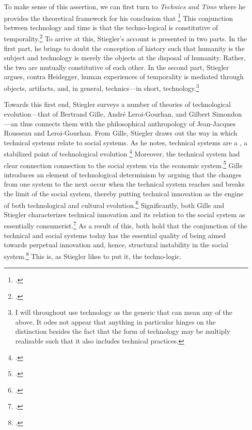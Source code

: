 \documentclass[letterpaper,notitlepage,12pt]{article}
\begin{document}
To make sense of this assertion, we can first turn to \textit{Technics and Time}
where he provides the theoretical framework for his conclusion that
\footcite[p.
17]{stiegler_technics_1998}
This conjunction between technology and time is that the techno-logical is
constitutive of temporality.\footcite[p. 18]{stiegler_technics_1998}
To arrive at this, Stiegler's account is presented in two parts.
In the first part, he brings to doubt the conception of history such that
humanity is the subject and technology is merely the objects at the disposal of
humanity.
Rather, the two are mutually constitutive of each other.
In the second part, Stiegler argues, contra Heidegger, human experiences of
temporality is mediated through objects, artifacts, and, in general,
technics---in short, technology.\footnote{I will throughout use technology as
  the generic that can mean any of the above. It odes not appear that anything
  in particular hinges on the distinction besides the fact that the form of
  technology may be multiply realizable such that it also includes technical
practices.}

Towards this first end, Stiegler surveys a number of theories of technological
evolution---that of Bertrand Gille, Andr\'{e} Leroi-Gourhan, and Gilbert
Simondon---an thus connects them with the philosophical anthropology of
Jean-Jacques Rousseau and Leroi-Gourhan.
From Gille, Stiegler draws out the way in which technical systems relate to
social systems.
As he notes, technical systems are a , a
  stabilized point of technological evolution \footcite[p.
  31]{stiegler_technics_1998}
Moreover, the technical system had clear connection connection to the social
system via the economic system.\footcite[p. 31--2]{stiegler_technics_1998}
Gille introduces an element of technological determinism by arguing that the
changes from one system to the next occur when the technical system reaches and
breaks the limit of the social system, thereby putting technical innovation as
the engine of both technological and cultural evolution.\footcite[p.
33--5]{stiegler_technics_1998}
Significantly, both Gille and Stiegler characterizes technical innovation and
its relation to the social system as essentially consumerist.\footcite[p.
31--2]{stiegler_technics_1998}
As a result of this, both hold that the conjunction of the technical and social
systems today has the essential quality of being aimed towards perpetual
innovation and, hence, structural instability in the social system.\footcite[p.
37--43]{stiegler_technics_1998}
This is, as Stiegler likes to put it, the techno-logic.
\end{document}
